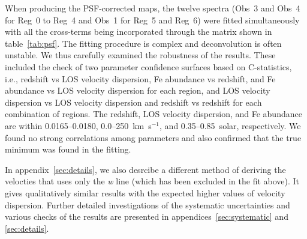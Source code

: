 When producing the PSF-corrected maps, the twelve spectra (Obs~3 and Obs~4 for Reg~0 to Reg~4 and Obs~1 for Reg~5 and Reg~6) were fitted simultaneously with all the cross-terms being incorporated through the matrix shown in table~\ref{tab:psf}. The fitting procedure is complex and deconvolution is often unstable. We thus carefully examined the robustness of the results. These included the check of two parameter confidence surfaces based on C-statistics, i.e., redshift vs LOS velocity dispersion, Fe abundance vs redshift, and Fe abundance vs LOS velocity dispersion for each region, and LOS velocity dispersion vs LOS velocity dispersion and redshift vs redshift for each combination of regions. The redshift, LOS velocity dispersion, and Fe abundance are within 0.0165--0.0180, 0.0--250~km~s$^{-1}$, and 0.35--0.85~solar, respectively. We found no strong correlations among parameters and also confirmed that the true minimum was found in the fitting.

In appendix~\ref{sec:details}, we also desrcibe a different method of deriving the velocties that uses only the {\it w} line (which has been excluded in the fit above). It gives qualitatively similar results with the expected higher values of velocity dispersion. Further detailed investigations of the systematic uncertainties and various checks of the results are presented in appendices~\ref{sec:systematic} and \ref{sec:details}.
